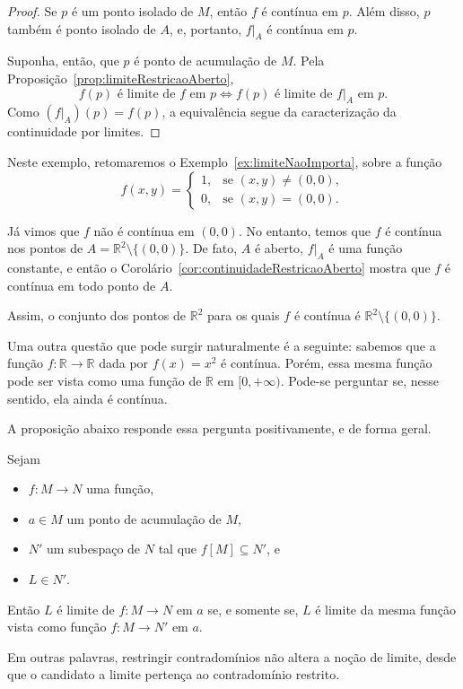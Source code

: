 \begin{proof}
    Se $p$ é um ponto isolado de $M$, então $f$ é contínua em $p$.
    Além disso, $p$ também é ponto isolado de $A$, e, portanto, $f|_A$ é contínua em $p$.

    Suponha, então, que $p$ é ponto de acumulação de $M$.
    Pela Proposição~\ref{prop:limiteRestricaoAberto},
    \[
        f(p) \text{ é limite de } f \text{ em } p
        \iff
        f(p) \text{ é limite de } f|_A \text{ em } p.
    \]
    Como $(f|_A)(p)=f(p)$, a equivalência segue da caracterização da continuidade por limites.
\end{proof}

\begin{example}
    Neste exemplo, retomaremos o Exemplo~\ref{ex:limiteNaoImporta}, sobre a função
    \[
        f(x, y) = \begin{cases}
            1, & \text{se } (x, y) \neq (0, 0),\\
            0, & \text{se } (x, y) = (0, 0).
        \end{cases}
    \]

    Já vimos que $f$ não é contínua em $(0, 0)$.
    No entanto, temos que $f$ é contínua nos pontos de $A=\mathbb R^2\setminus\{(0, 0)\}$.
    De fato, $A$ é aberto, $f|_A$ é uma função constante, e então o Corolário~\ref{cor:continuidadeRestricaoAberto} mostra que $f$ é contínua em todo ponto de $A$.

    Assim, o conjunto dos pontos de $\mathbb R^2$ para os quais $f$ é contínua é $\mathbb R^2\setminus\{(0, 0)\}$.
\end{example}

Uma outra questão que pode surgir naturalmente é a seguinte: sabemos que a função $f:\mathbb R\rightarrow \mathbb R$ dada por $f(x) = x^2$ é contínua.
Porém, essa mesma função pode ser vista como uma função de $\mathbb R$ em $[0, +\infty)$.
Pode-se perguntar se, nesse sentido, ela ainda é contínua.

A proposição abaixo responde essa pergunta positivamente, e de forma geral.

\begin{proposition}\label{prop:limiteRestricaoContradominio}
    Sejam
    \begin{itemize}
        \item $f: M \to N$ uma função,
        \item $a \in M$ um ponto de acumulação de $M$,
        \item $N'$ um subespaço de $N$ tal que $f[M]\subseteq N'$, e
        \item $L\in N'$.
    \end{itemize}

    Então $L$ é limite de $f:M\to N$ em $a$ se, e somente se, $L$ é limite da mesma função vista como função $f:M\to N'$ em $a$.

    Em outras palavras, restringir contradomínios não altera a noção de limite, desde que o candidato a limite pertença ao contradomínio restrito.
\end{proposition}

